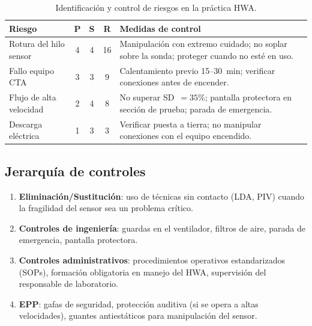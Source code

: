 \documentclass[12pt,a4paper]{article}
\begin{document}
\begin{table}[H]
	\centering
	\caption{Identificación y control de riesgos en la práctica HWA.}
	\label{tab:riesgos}
	\small
	\begin{tabularx}{\textwidth}{l c c c X}
		\toprule
		\textbf{Riesgo}         & \textbf{P}                                                  & \textbf{S} & \textbf{R}
		                        & \textbf{Medidas de control}                                                           \\
		\midrule
		Rotura del hilo sensor  & 4                                                           & 4          & 16
		                        & Manipulación con extremo cuidado; no soplar sobre la sonda;
		proteger cuando no esté en uso.                                                                                 \\
		Fallo equipo CTA        & 3                                                           & 3          & 9
		                        & Calentamiento previo 15--30~min; verificar conexiones antes
		de encender.                                                                                                    \\
		Flujo de alta velocidad & 2                                                           & 4          & 8
		                        & No superar SD~$= 35\%$; pantalla protectora en sección de
		prueba; parada de emergencia.                                                                                   \\
		Descarga eléctrica      & 1                                                           & 3          & 3
		                        & Verificar puesta a tierra; no manipular conexiones con el
		equipo encendido.                                                                                               \\
		\bottomrule
	\end{tabularx}
\end{table}

\subsection{Jerarquía de controles}

\begin{enumerate}
	\item \textbf{Eliminación/Sustitución}: uso de técnicas sin contacto
	      (LDA, PIV) cuando la fragilidad del sensor sea un problema
	      crítico.
	\item \textbf{Controles de ingeniería}: guardas en el ventilador,
	      filtros de aire, parada de emergencia, pantalla protectora.
	\item \textbf{Controles administrativos}: procedimientos operativos
	      estandarizados (SOPs), formación obligatoria en manejo del HWA,
	      supervisión del responsable de laboratorio.
	\item \textbf{EPP}: gafas de seguridad, protección auditiva (si se
	      opera a altas velocidades), guantes antiestáticos para manipulación
	      del sensor.
\end{enumerate}
\end{document}
